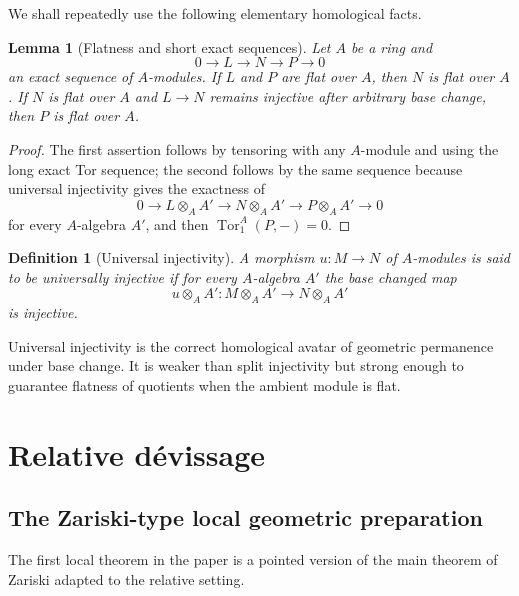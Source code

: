 \documentclass[11pt,oneside]{article}
\newtheorem{lemma}[theorem]{Lemma}
\newtheorem{definition}[theorem]{Definition}
\newcommand{\Tor}{\operatorname{Tor}}
\newcommand{\ot}{\otimes}
\begin{document}
We shall repeatedly use the following elementary homological facts.

\begin{lemma}[Flatness and short exact sequences]\label{lem:ses-flat}
Let $A$ be a ring and
\[
0\to L\to N\to P\to 0
\]
an exact sequence of $A$-modules.  If $L$ and $P$ are flat over $A$, then $N$ is flat over $A$.  If $N$ is flat over $A$ and $L\to N$ remains injective after arbitrary base change, then $P$ is flat over $A$.
\end{lemma}

\begin{proof}
The first assertion follows by tensoring with any $A$-module and using the long exact Tor sequence; the second follows by the same sequence because universal injectivity gives the exactness of
\[
0\to L\ot_A A'\to N\ot_A A'\to P\ot_A A'\to 0
\]
for every $A$-algebra $A'$, and then $\Tor_1^A(P,-)=0$.
\end{proof}

\begin{definition}[Universal injectivity]
A morphism $u\colon M\to N$ of $A$-modules is said to be \emph{universally injective} if for every $A$-algebra $A'$ the base changed map
\[
u\ot_A A'\colon M\ot_A A'\longrightarrow N\ot_A A'
\]
is injective.
\end{definition}

Universal injectivity is the correct homological avatar of geometric permanence under base change.  It is weaker than split injectivity but strong enough to guarantee flatness of quotients when the ambient module is flat.

\section{Relative d\'evissage}

\subsection{The Zariski-type local geometric preparation}

The first local theorem in the paper is a pointed version of the main theorem of Zariski adapted to the relative setting.
\end{document}
